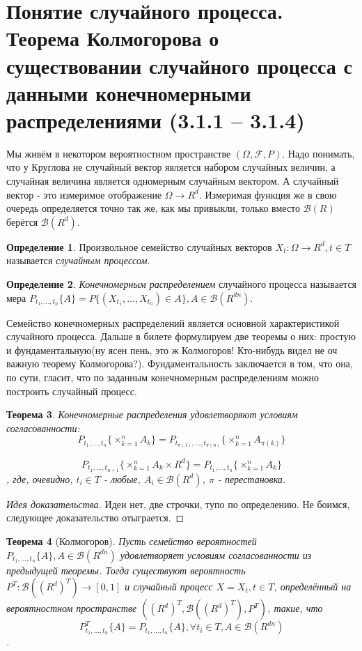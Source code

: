 \documentclass[16pt]{article}
\newtheorem{theorem}{Теорема}[section]
\theoremstyle{definition}
\newtheorem{definition}[theorem]{Определение}
\begin{document}
\section{Понятие случайного процесса. Теорема Колмогорова о существовании случайного
процесса с данными конечномерными распределениями (3.1.1 – 3.1.4)}
Мы живём в некотором вероятностном пространстве $(\Omega, \mathcal{F}, P)$. Надо понимать, что у Круглова не случайный вектор является набором случайных величин, а случайная величина является одномерным случайным вектором. А случайный вектор - это измеримое отображение $\Omega \rightarrow R^d$. Измеримая функция же в свою очередь определяется точно так же, как мы привыкли, только вместо $\mathcal{B}(R)$ берётся $\mathcal{B}(R^d)$.
\begin{definition}
Произвольное семейство случайных векторов $X_t: \Omega \rightarrow R^d, t \in T$ называется \textit{случайным процессом}.
\end{definition}
\begin{definition}
\textit{Конечномерным распределением} случайного процесса называется мера $P_{t_1, \ldots, t_n}\{A\} = P\{(X_{t_1}, \ldots, X_{t_n}) \in A\}, A \in \mathcal{B}(R^{dn})$.
\end{definition}
Семейство конечномерных распределений является основной характеристикой случайного процесса. Дальше в билете формулируем две теоремы о них: простую и фундаментальную(ну ясен пень, это ж Колмогоров! Кто-нибудь видел не оч важную теорему Колмогорова?). Фундаментальность заключается в том, что она, по сути, гласит, что по заданным конечномерным распределениям можно построить случайный процесс.
\begin{theorem}
Конечномерные распределения удовлетворяют условиям согласованности:
$$P_{t_1, \ldots, t_n}\{\times_{k=1}^n A_k\} = P_{t_{\pi(1)}, \ldots, t_{\pi(n)}}\{\times_{k=1}^n A_{\pi(k)}\}$$

$$P_{t_1, \ldots, t_{n+1}}\{\times_{k=1}^n A_k \times R^d\} = P_{t_1, \ldots, t_n}\{\times_{k=1}^n A_k\}$$, где, очевидно, $t_i \in T$ - любые, $A_i \in \mathcal{B}(R^d)$, $\pi$ - перестановка.
\end{theorem}
\begin{proof}[Идея доказательства]
Идеи нет, две строчки, тупо по определению. Не боимся, следующее доказательство отыграется.
\end{proof}
\begin{theorem}[Колмогоров]
Пусть семейство вероятностей $P_{t_1, \ldots, t_n}\{A\}, A \in \mathcal{B}(R^{dn})$ удовлетворяет условиям согласованности из предыдущей теоремы. Тогда существуют вероятность $P^T: \mathcal{B}((R^d)^T) \rightarrow [0, 1]$ и случайный процесс $X = {X_t, t \in T}$, определённый на вероятностном пространстве $((R^d)^T, \mathcal{B}((R^d)^T), P^T)$, такие, что $$P_{t_1, \ldots, t_n}^T\{A\} = P_{t_1, \ldots, t_n}\{A\}, \forall t_i \in T, A \in \mathcal{B}(R^{dn})$$.
\end{theorem}
\end{document}
